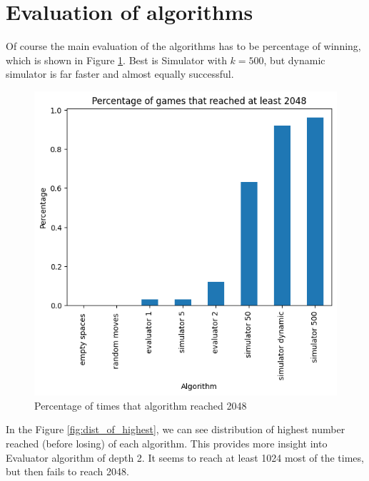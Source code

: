 \documentclass[sigconf,nonacm]{acmart}
\begin{document}
\section{Evaluation of algorithms}

Of course the main evaluation of the algorithms has to be percentage of winning, which is shown in Figure \ref{fig:win_perc}. Best is Simulator with $k=500$, but dynamic simulator is far faster and almost equally successful.

\begin{figure}[!ht]
    \centering
    \begin{adjustbox}{scale=0.45}
    \includegraphics{static/percentage_of_wins.png}
    \end{adjustbox}
    \caption{Percentage of times that algorithm reached 2048}
    \label{fig:win_perc}
\end{figure}

In the Figure \ref{fig:dist_of_highest}, we can see distribution of highest number reached (before losing) of each algorithm. This provides more insight into Evaluator algorithm of depth 2. It seems to reach at least 1024 most of the times, but then fails to reach 2048.
\end{document}
